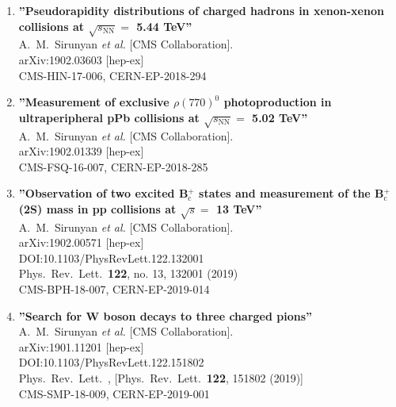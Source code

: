\begin{enumerate}
\item%
{\bf ''Pseudorapidity distributions of charged hadrons in xenon-xenon collisions at $\sqrt{s_\mathrm{NN}} =$ 5.44 TeV''}
  \\{}A.~M.~Sirunyan {\it et al.} [CMS Collaboration].
  \\{}arXiv:1902.03603 [hep-ex]
  \\{}CMS-HIN-17-006, CERN-EP-2018-294

\item%
{\bf ''Measurement of exclusive $\rho(770)^0$ photoproduction in ultraperipheral pPb collisions at $\sqrt{s_\mathrm{NN}} =$ 5.02 TeV''}
  \\{}A.~M.~Sirunyan {\it et al.} [CMS Collaboration].
  \\{}arXiv:1902.01339 [hep-ex]
  \\{}CMS-FSQ-16-007, CERN-EP-2018-285

\item%
{\bf ''Observation of two excited B$^+_\mathrm{c}$ states and measurement of the B$^+_\mathrm{c}$(2S) mass in pp collisions at $\sqrt{s} =$ 13 TeV''}
  \\{}A.~M.~Sirunyan {\it et al.} [CMS Collaboration].
  \\{}arXiv:1902.00571 [hep-ex]
  \\{}DOI:10.1103/PhysRevLett.122.132001
  \\{}Phys.\ Rev.\ Lett.\  {\bf 122}, no. 13, 132001 (2019)
  \\{}CMS-BPH-18-007, CERN-EP-2019-014

\item%
{\bf ''Search for W boson decays to three charged pions''}
  \\{}A.~M.~Sirunyan {\it et al.} [CMS Collaboration].
  \\{}arXiv:1901.11201 [hep-ex]
  \\{}DOI:10.1103/PhysRevLett.122.151802
  \\{}Phys.\ Rev.\ Lett.\ , [Phys.\ Rev.\ Lett.\  {\bf 122}, 151802 (2019)]
  \\{}CMS-SMP-18-009, CERN-EP-2019-001


\end{enumerate}
